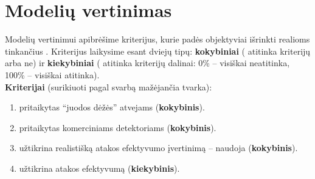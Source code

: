 \section{Modelių vertinimas}\label{sec:criteria}

Modelių vertinimui apibrėšime kriterijus, kurie padės objektyviai išrinkti
realioms  tinkančius . Kriterijus
laikysime esant dviejų tipų: \textbf{kokybiniai} ( atitinka
kriterijų arba ne) ir \textbf{kiekybiniai} ( atitinka
kriterijų dalinai: 0\% -- visiškai neatitinka, 100\% -- visiškai atitinka). \\

\textbf{Kriterijai} (surikiuoti pagal svarbą mažėjančia tvarka):
\vspace{-5pt}
\begin{enumerate}[label=K-\arabic*., ref=K-\arabic*]
    \item {} pritaikytas \enquote{juodos dėžės} atvejams (\textbf{kokybinis}).\label{enum:criteria:blackbox}
    \item {} pritaikytas komerciniams detektoriams (\textbf{kokybinis}).\label{enum:criteria:commercial}
    \item {} užtikrina realistišką atakos efektyvumo įvertinimą -- naudoja  (\textbf{kokybinis}).\label{enum:criteria:surrogate}
    \item {} užtikrina atakos efektyvumą (\textbf{kiekybinis}).\label{enum:criteria:effective}
\end{enumerate}

\newenvironment{criteriaTable}{
    \newcommand{\rowLast}[1]{##1}
    \newcommand{\row}[1]{##1 \\}
    \newcommand{\tbl}[1]{\gdef\Table{##1}}

    \def\Table{}
}{
    \begin{table}[h]
        \centering
        \begin{tabular}{|l|c|c|c|S|}
            \row{
            \textbf{\Glsshort{framework}}           &
            \textbf{\ref{enum:criteria:blackbox}}   &
            \textbf{\ref{enum:criteria:commercial}} &
            \textbf{\ref{enum:criteria:surrogate}}  &
                \textbf{\ref{enum:criteria:effective}}
            } \midrule
            \Table{}
        \end{tabular}
        \caption{\Glsplwhom{framework} vertinimo pagal kriterijus lentelė. \Glspl{framework} surikiuoti pagal įvertinimą mažėjančia tvarka.}
    \end{table}
}


